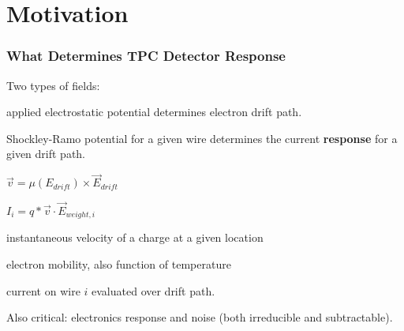\documentclass[xcolor=dvipsnames]{beamer}
\begin{document}





\section{Motivation}

\begin{frame}[fragile]
  \frametitle{What Determines TPC Detector Response}
  Two types of fields:
  \begin{description}\footnotesize
  \item[$\vec{E}_{drift}$] applied electrostatic potential determines electron drift path.
  \item[$\vec{E}_{weight,i}$] Shockley-Ramo potential for a given wire determines
    the current \textbf{response} for a given drift path.
  \end{description}

  \begin{center}
    $\vec{v} = \mu(E_{drift}) \times \vec{E}_{drift}$

    $I_{i} = q * \vec{v} \cdot \vec{E}_{weight,i}$
  \end{center}
  \begin{description}\scriptsize
  \item[$\vec{v}$] instantaneous velocity of a charge at a given location
  \item[$\mu$] electron mobility, also function of temperature
  \item[$I_i$] current on wire $i$ evaluated over drift path.
  \end{description}
  Also critical: electronics response and noise (both irreducible and subtractable).
\end{frame}
\end{document}
